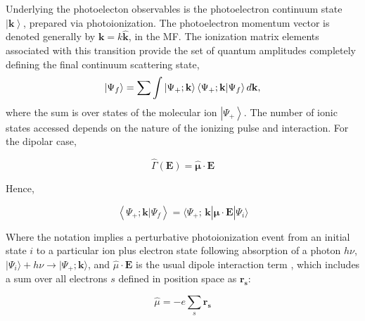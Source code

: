 \documentclass[10pt]{article}
\begin{document}
Underlying the photoelecton observables is the photoelectron continuum state $\left|\mathbf{k}\right>$, prepared via photoionization.
The photoelectron momentum vector is denoted generally by $\boldsymbol{\mathbf{k}}=k\mathbf{\hat{k}}$, in the MF. %
The ionization matrix elements associated with this transition %
provide the set of quantum amplitudes completely defining the final continuum scattering state,
\begin{equation}
\left|\Psi_f\right> = \sum{\int{\left|\Psi_{+};\bf{k}\right>\left<\Psi_{+};\mathbf{k}|\Psi_f\right> d\bf{k}}},
\label{eq:cstate}
\end{equation}
where the sum is over states of the molecular ion $\left|\Psi_{+}\right>$. The number of ionic states accessed depends on the nature of the ionizing pulse and interaction. For the dipolar case,

\begin{equation}
\hat{\Gamma}(\boldsymbol{\mathbf{E}}) = \hat{\mathbf{\mu}}\cdot\boldsymbol{\mathbf{E}}
\end{equation}

Hence,

\begin{equation}
\left<\Psi_{+};\mathbf{k}|\Psi_f\right> =\langle\Psi_{+};\,\mathbf{k}|\hat{\mathbf{\mu}}\cdot\boldsymbol{\mathbf{E}}|\Psi_{i}\rangle
\label{eq:matE-dipole}
\end{equation}

Where the notation implies a perturbative photoionization event from an initial state $i$ to a particular ion plus electron state following absorption of a photon $h\nu$, %
$|\Psi_{i}\rangle+h\nu{\rightarrow}|\Psi_{+};\boldsymbol{\mathbf{k}}\rangle$, and $\hat{\mu}\cdot\boldsymbol{\mathbf{E}}$ is the usual dipole interaction term \cite{qOptics}, which includes a sum over all electrons $s$ defined in position space as $\mathbf{r_{s}}$:  

\begin{equation}
\hat{\mu}=-e\sum_{s}\mathbf{r_{s}}
\label{eq:dipole-operator}
\end{equation}
\end{document}
